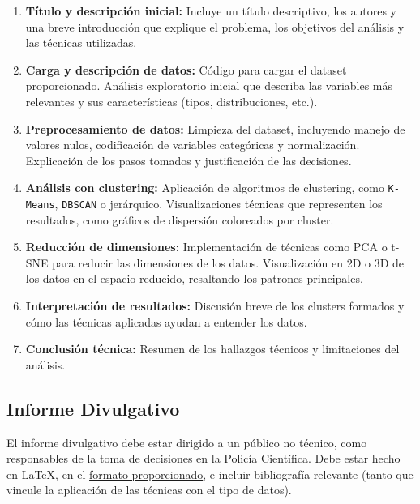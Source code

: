 \documentclass[a4,11pt]{aleph-notas}
\begin{document}
\begin{enumerate}[leftmargin=*, label={\textbf{\arabic*.}}]
\item \textbf{Título y descripción inicial:} Incluye un título descriptivo, los autores y una breve introducción que explique el problema, los objetivos del análisis y las técnicas utilizadas.

\item \textbf{Carga y descripción de datos:} Código para cargar el dataset proporcionado. Análisis exploratorio inicial que describa las variables más relevantes y sus características (tipos, distribuciones, etc.).

\item \textbf{Preprocesamiento de datos:} Limpieza del dataset, incluyendo manejo de valores nulos, codificación de variables categóricas y normalización. Explicación de los pasos tomados y justificación de las decisiones.

\item \textbf{Análisis con clustering:} Aplicación de algoritmos de clustering, como \texttt{K-Means}, \texttt{DBSCAN} o jerárquico.  Visualizaciones técnicas que representen los resultados, como gráficos de dispersión coloreados por cluster.

\item \textbf{Reducción de dimensiones:} Implementación de técnicas como PCA o t-SNE para reducir las dimensiones de los datos. Visualización en 2D o 3D de los datos en el espacio reducido, resaltando los patrones principales.

\item \textbf{Interpretación de resultados:} Discusión breve de los clusters formados y cómo las técnicas aplicadas ayudan a entender los datos.

\item \textbf{Conclusión técnica:} Resumen de los hallazgos técnicos y limitaciones del análisis.
\end{enumerate}


\subsection{Informe Divulgativo}
El informe divulgativo debe estar dirigido a un público no técnico, como responsables de la toma de decisiones en la Policía Científica.  Debe estar hecho en \LaTeX{}, en el \href{https://www.overleaf.com/latex/templates/formato-tareas-puce/nkgwqjtcrvms}{formato proporcionado}, e incluir bibliografía relevante (tanto que vincule la aplicación de las técnicas con el tipo de datos).
\end{document}
